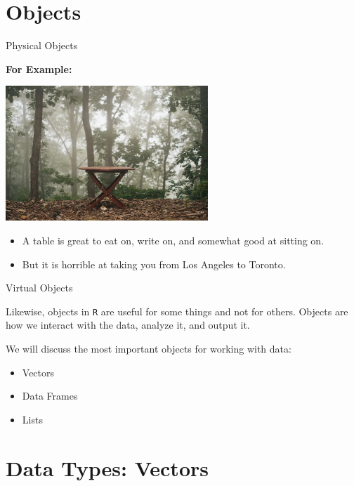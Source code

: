 \documentclass[ignorenonframetext,]{beamer}
\providecommand{\tightlist}{%
\setlength{\itemsep}{0pt}\setlength{\parskip}{0pt}}
\begin{document}
\section{Objects}\label{objects}

\begin{frame}{Physical Objects}

\textbf{For Example:}

\vspace{6pt}\centerline{\includegraphics[height=2in]{Figures/table_forest.jpg}}

\begin{itemize}
\tightlist
\item
  A table is great to eat on, write on, and somewhat good at sitting on.
\item
  But it is horrible at taking you from Los Angeles to Toronto.
\end{itemize}

\end{frame}

\begin{frame}[fragile]{Virtual Objects}

Likewise, objects in \texttt{R} are useful for some things and not for
others. Objects are how we interact with the data, analyze it, and
output it.

We will discuss the most important objects for working with data:

\begin{itemize}[<+->]
\tightlist
\item
  Vectors
\item
  Data Frames
\item
  Lists
\end{itemize}

\end{frame}

\section{Data Types: Vectors}\label{data-types-vectors}
\end{document}
